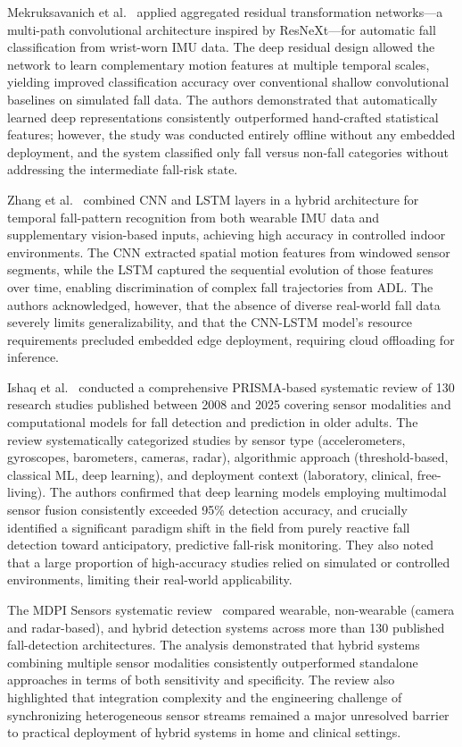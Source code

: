 \documentclass[conference]{IEEEtran}
\begin{document}
Mekruksavanich et al.~\cite{mekruksavanich2022} applied aggregated residual
transformation networks---a multi-path convolutional architecture inspired
by ResNeXt---for automatic fall classification from wrist-worn IMU data. The
deep residual design allowed the network to learn complementary motion
features at multiple temporal scales, yielding improved classification
accuracy over conventional shallow convolutional baselines on simulated fall
data. The authors demonstrated that automatically learned deep representations
consistently outperformed hand-crafted statistical features; however, the
study was conducted entirely offline without any embedded deployment, and
the system classified only fall versus non-fall categories without addressing
the intermediate fall-risk state.

Zhang et al.~\cite{zhang2025} combined CNN and LSTM layers in a hybrid
architecture for temporal fall-pattern recognition from both wearable IMU
data and supplementary vision-based inputs, achieving high accuracy in
controlled indoor environments. The CNN extracted spatial motion features
from windowed sensor segments, while the LSTM captured the sequential
evolution of those features over time, enabling discrimination of complex
fall trajectories from ADL. The authors acknowledged, however, that the
absence of diverse real-world fall data severely limits generalizability,
and that the CNN-LSTM model's resource requirements precluded embedded edge
deployment, requiring cloud offloading for inference.

Ishaq et al.~\cite{ishaq2026} conducted a comprehensive PRISMA-based
systematic review of 130 research studies published between 2008 and 2025
covering sensor modalities and computational models for fall detection and
prediction in older adults. The review systematically categorized studies
by sensor type (accelerometers, gyroscopes, barometers, cameras, radar),
algorithmic approach (threshold-based, classical ML, deep learning), and
deployment context (laboratory, clinical, free-living). The authors confirmed
that deep learning models employing multimodal sensor fusion consistently
exceeded 95\% detection accuracy, and crucially identified a significant
paradigm shift in the field from purely reactive fall detection toward
anticipatory, predictive fall-risk monitoring. They also noted that a large
proportion of high-accuracy studies relied on simulated or controlled
environments, limiting their real-world applicability.

The MDPI Sensors systematic review~\cite{mdpisensors2025} compared wearable,
non-wearable (camera and radar-based), and hybrid detection systems across
more than 130 published fall-detection architectures. The analysis
demonstrated that hybrid systems combining multiple sensor modalities
consistently outperformed standalone approaches in terms of both sensitivity
and specificity. The review also highlighted that integration complexity and
the engineering challenge of synchronizing heterogeneous sensor streams
remained a major unresolved barrier to practical deployment of hybrid
systems in home and clinical settings.
\end{document}
